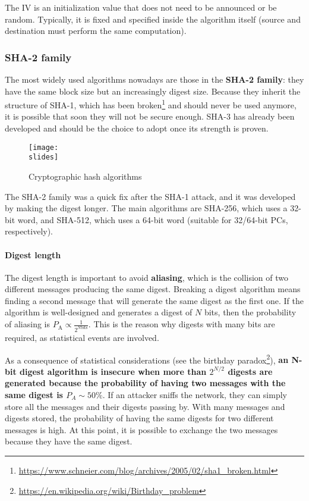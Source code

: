 The IV is an initialization value that does not need to be announced or be random. Typically, it is fixed and specified inside the algorithm itself (source and destination must perform the same computation).


\subsubsection{SHA-2 family}
The most widely used algorithms nowadays are those in the \textbf{SHA-2 family}: they have the same block size but an increasingly digest size. Because they inherit the structure of SHA-1, which has been broken\footnote{\url{https://www.schneier.com/blog/archives/2005/02/sha1_broken.html}} and should never be used anymore, it is possible that soon they will not be secure enough.
SHA-3 has already been developed and should be the choice to adopt once its strength is proven.

\begin{figure}[h]
    \centering
    \texttt{[image: \\slides]}
    \caption{Cryptographic hash algorithms}
\end{figure}


The SHA-2 family was a quick fix after the SHA-1 attack, and it was developed by making the digest longer. The main algorithms are SHA-256, which uses a 32-bit word, and SHA-512, which uses a 64-bit word (suitable for 32/64-bit PCs, respectively).

\paragraph{Digest length}
The digest length is important to avoid \textbf{aliasing}, which is the collision of two different messages producing the same digest. Breaking a digest algorithm means finding a second message that will generate the same digest as the first one. If the algorithm is well-designed and generates a digest of \(N\) bits, then the probability of aliasing is \(P_{\text{A}} \propto \frac{1}{2^{N \text{bits}}}\).
This is the reason why digests with many bits are required, as statistical events are involved.

As a consequence of statistical considerations (see the birthday paradox\footnote{\url{https://en.wikipedia.org/wiki/Birthday_problem}}), \textbf{an N-bit digest algorithm is insecure when more than \(2^{N/2}\) digests are generated because the probability of having two messages with the same digest is \(P_{A} \sim 50\%\)}. If an attacker sniffs the network, they can simply store all the messages and their digests passing by. With many messages and digests stored, the probability of having the same digests for two different messages is high. At this point, it is possible to exchange the two messages because they have the same digest.

